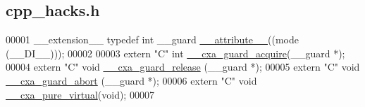 \hypertarget{cpp__hacks_8h_source}{
\subsection{cpp\_\-hacks.h}
}

\begin{DoxyCode}
00001 \_\_extension\_\_ \textcolor{keyword}{typedef} \textcolor{keywordtype}{int} \_\_guard \hyperlink{cpp__hacks_8h_aa5aa60072f4063655d5283b6d7b7ab44}{__attribute__}((mode (\_\_DI\_\_))); 
00002 
00003 \textcolor{keyword}{extern} \textcolor{stringliteral}{"C"} \textcolor{keywordtype}{int} \hyperlink{cpp__hacks_8h_a239ddd7f6e7ee1b05b59b2e56d8afb40}{__cxa_guard_acquire}(\_\_guard *); 
00004 \textcolor{keyword}{extern} \textcolor{stringliteral}{"C"} \textcolor{keywordtype}{void} \hyperlink{cpp__hacks_8h_aab72c37f0b3e6fc38d293bd4f8dd61ed}{__cxa_guard_release} (\_\_guard *); 
00005 \textcolor{keyword}{extern} \textcolor{stringliteral}{"C"} \textcolor{keywordtype}{void} \hyperlink{cpp__hacks_8h_a357afb2dc20a652447f3a529dbda60e4}{__cxa_guard_abort} (\_\_guard *); 
00006 \textcolor{keyword}{extern} \textcolor{stringliteral}{"C"} \textcolor{keywordtype}{void} \hyperlink{cpp__hacks_8h_a4464d4205cf92370b8d5077d93bc48a6}{__cxa_pure_virtual}(\textcolor{keywordtype}{void});
00007 
\end{DoxyCode}
